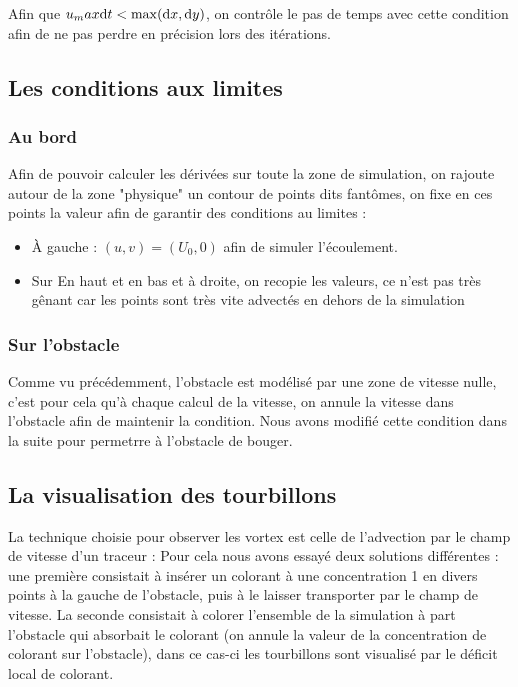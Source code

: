 			Afin que $u_max \mathrm{d}t < \max(\mathrm{d}x, \mathrm{d}y)$, on contrôle le pas de temps avec cette condition afin de ne pas perdre en précision lors des itérations.
		
		
	\subsection{Les conditions aux limites}
		
		\subsubsection{Au bord}
			Afin de pouvoir calculer les dérivées sur toute la zone de simulation, on rajoute autour de la zone "physique" un contour de points dits fantômes, on fixe en ces points la valeur afin de garantir des conditions au limites : 
			\begin{itemize}
				\item À gauche : $(u,v) = (U_0,0)$ afin de simuler l'écoulement.
				\item Sur En haut et en bas et à droite, on recopie les valeurs, ce n'est pas très gênant car les points sont très vite advectés en dehors de la simulation
			\end{itemize}
		
		\subsubsection{Sur l'obstacle}

			Comme vu précédemment, l'obstacle est modélisé par une zone de vitesse nulle, c'est pour cela qu'à chaque calcul de la vitesse, on annule la vitesse dans l'obstacle afin de maintenir la condition. Nous avons modifié cette condition dans la suite pour permetrre à l'obstacle de bouger.

	\subsection{La visualisation des tourbillons}
	
		La technique choisie pour observer les vortex est celle de l'advection par le champ de vitesse d'un traceur : Pour cela nous avons essayé deux solutions différentes : une première consistait à insérer un colorant à une concentration 1 en divers points à la gauche de l'obstacle, puis à le laisser transporter par le champ de vitesse. La seconde consistait à colorer l'ensemble de la simulation à part l'obstacle qui absorbait le colorant (on annule la valeur de la concentration de colorant sur l'obstacle), dans ce cas-ci les tourbillons sont visualisé par le déficit local de colorant.
		
